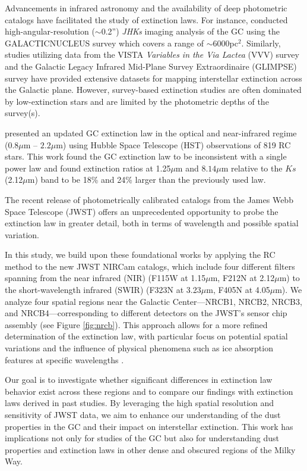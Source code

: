 \documentclass[twocolumn]{aastex631}
\begin{document}
Advancements in infrared astronomy and the availability of deep photometric
catalogs have  facilitated the study of extinction laws. For instance,
\citep{NoguerasLara2018,NoguerasLara2020} conducted high-angular-resolution ($\sim$0.2'')
\textit{JHKs} imaging analysis of the GC using the GALACTICNUCLEUS survey which covers
a range of $\sim$6000pc$^2$.  Similarly, studies utilizing data from the VISTA \textit{Variables in the Via
Lactea} (VVV) survey \citep{Minniti2010} and the Galactic Legacy
Infrared Mid-Plane Survey Extraordinaire (GLIMPSE) survey
\citep[e.g.][]{Benjamin2003} have
provided extensive datasets for mapping interstellar extinction across the
Galactic plane. However, survey-based extinction studies are often dominated by low-extinction
stars and are limited by the photometric depths of the survey(s).

\citep{Hosek2018} presented an updated GC extinction
law in the optical and near-infrared regime (0.8$\mu$m -- $2.2\mu$m) using Hubble Space Telescope (HST) observations of 819 RC stars. This work found the GC extinction law to be inconsistent with a single power law and found extinction ratios at 1.25$\mu$m and
$8.14\mu$m relative to the $Ks$ (2.12$\mu$m) band to be 18\% and 24\% larger than the previously
used \citep{Nishiyama2009} law.

The recent release of photometrically calibrated catalogs from the James Webb
Space Telescope (JWST) offers an unprecedented opportunity to probe the
extinction law in greater detail, both in terms of wavelength and possible spatial variation.

In this study, we build upon these foundational works by applying the RC method
to the new JWST NIRCam catalogs, which include four different filters spanning
from the near infrared (NIR) (F115W at 1.15$\mu$m, F212N at 2.12$\mu$m) to the
short-wavelength infrared (SWIR) (F323N at 3.23$\mu$m, F405N at 4.05$\mu$m).
We analyze four spatial regions near the Galactic Center—NRCB1, NRCB2, NRCB3,
and NRCB4—corresponding to different detectors on the JWST's sensor chip
assembly (see Figure \ref{fig:nrcb}). This approach allows for a more refined
determination of the extinction law, with particular focus on potential spatial
variations and the influence of physical phenomena such as ice absorption
features at specific wavelengths \citep[e.g.][]{Fritz2011}.

Our goal is to investigate whether significant differences in extinction law
behavior exist across these regions and to compare our findings with extinction
laws derived in past studies. By leveraging the high spatial resolution and
sensitivity of JWST data, we aim to enhance our understanding of the dust
properties in the GC and their impact on interstellar extinction. This work has
implications not only for studies of the GC but also for understanding dust
properties and extinction laws in other dense and obscured regions of the Milky
Way.
\end{document}
